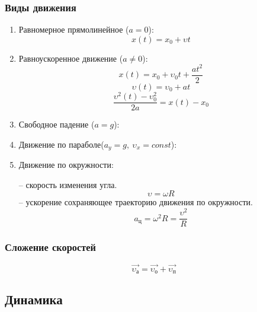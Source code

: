\subsubsection{Виды движения}
\begin{enumerate}
	\item Равномерное прямолинейное ($a = 0$):
	$$x(t) = x_0 + \upsilon t$$

	\item Равноускоренное движение ($a\neq 0$):
	$$x(t) = x_0 + \upsilon_0 t + \frac{a t^2}{2}$$
	$$\upsilon(t) = \upsilon_0 + at$$
	$$\frac{\upsilon^2(t)-\upsilon^2_0}{2a} = x(t) - x_0$$

	\item Свободное падение ($a = g$):
	\item Движение по параболе($a_y = g, ~\upsilon_x = const$):
	\item Движение по окружности:
	\par\medskip

	 -- скорость изменения угла.
	$$\upsilon = \omega R$$
	 -- ускорение сохраняющее траекторию движения по окружности.
	$$a_ц = \omega^2 R = \frac{\upsilon^2}{R}$$
\end{enumerate}

\subsubsection{Сложение скоростей}


$$\vec{\upsilon_а} = \vec{\upsilon_о} + \vec{\upsilon_п}$$


\subsection{Динамика}
